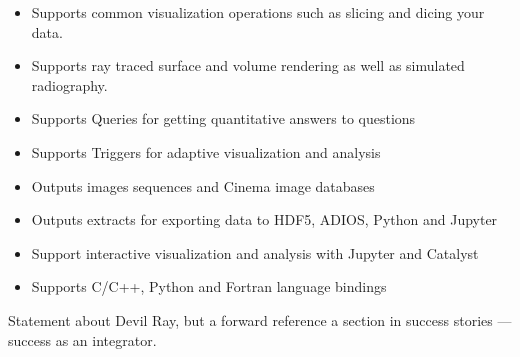 \begin{itemize}
  \item Supports common visualization operations such as slicing and dicing your data.
  \item Supports ray traced surface and volume rendering as well as simulated radiography.
  \item Supports Queries for getting quantitative answers to questions
  \item Supports Triggers for adaptive visualization and analysis
  \item Outputs images sequences and Cinema image databases
  \item Outputs extracts for exporting data to HDF5, ADIOS, Python and Jupyter
  \item Support interactive visualization and analysis with Jupyter and Catalyst
  \item Supports C/C++, Python and Fortran language bindings
\end{itemize}

Statement about Devil Ray, but a forward reference a section in success stories --- success as an integrator.
\fi




%


%

%

